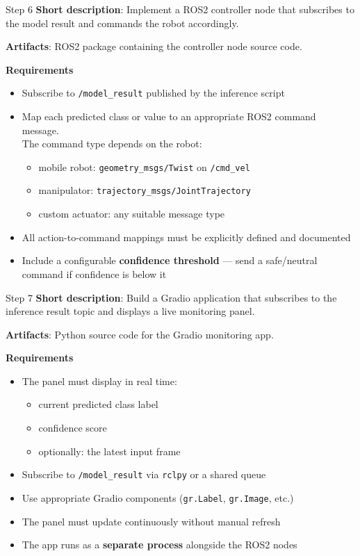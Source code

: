 \documentclass[aspectratio=169]{beamer}
\begin{document}
\begin{frame}[t]{Step 6}
\vspace{-0.3cm}
\textbf{Short description}: Implement a ROS2 controller node that subscribes to the model result and commands the robot accordingly.

\textbf{Artifacts}: ROS2 package containing the controller node source code.

\textbf{Requirements}
\footnotesize
\begin{itemize}
    \item Subscribe to \texttt{/model\_result} published by the inference script
    \item Map each predicted class or value to an appropriate ROS2 command message.\\
          The command type depends on the robot:
    \begin{itemize}\footnotesize
        \item mobile robot: \texttt{geometry\_msgs/Twist} on \texttt{/cmd\_vel}
        \item manipulator: \texttt{trajectory\_msgs/JointTrajectory}
        \item custom actuator: any suitable message type
    \end{itemize}
    \item All action-to-command mappings must be explicitly defined and documented
    \item Include a configurable \textbf{confidence threshold} --- send a safe/neutral command if confidence is below it
\end{itemize}
\end{frame}

\begin{frame}[t]{Step 7}
\vspace{-0.3cm}
\textbf{Short description}: Build a Gradio application that subscribes to the inference result topic and displays a live monitoring panel.

\textbf{Artifacts}: Python source code for the Gradio monitoring app.

\textbf{Requirements}
\footnotesize
\begin{itemize}
    \item The panel must display in real time:
    \begin{itemize}\footnotesize
        \item current predicted class label
        \item confidence score
        \item optionally: the latest input frame
    \end{itemize}
    \item Subscribe to \texttt{/model\_result} via \texttt{rclpy} or a shared queue
    \item Use appropriate Gradio components (\texttt{gr.Label}, \texttt{gr.Image}, etc.)
    \item The panel must update continuously without manual refresh
    \item The app runs as a \textbf{separate process} alongside the ROS2 nodes
\end{itemize}
\end{frame}
\end{document}
